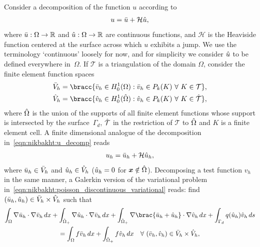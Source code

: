 Consider a decomposition of the function $u$ according to
%
\begin{equation}
  u = \Bar{u} + \mathcal{H} \Hat{u},
\label{eqn:nikbakht:u_decomp}
\end{equation}
%
where $\Bar{u}: \Omega \rightarrow \mathbb{R}$ and $\Hat{u}: \Omega
\rightarrow \mathbb{R}$ are continuous functions, and $\mathcal{H}$ is
the Heaviside function centered at the surface across which $u$ exhibits
a jump.  We use the terminology `continuous' loosely for now, and for
simplicity we consider $\Hat{u}$ to be defined everywhere in~$\Omega$.
If $\mathcal{T}$ is a triangulation of the domain $\Omega$, consider
the finite element function spaces
%
\begin{align}
  \Bar{V}_{h} &= \bracc{\Bar{v}_{h} \in H^{1}_{0}(\Omega)
                    : \Bar{v}_{h} \in P_{k}(K) \ \forall \ K \in \mathcal{T}},
\\
  \Hat{V}_{h} &= \bracc{\Hat{v}_{h} \in H^{1}_{0}(\Hat{\Omega})
                    : \Hat{v}_{h} \in P_{k}(K) \ \forall \ K \in \Hat{\mathcal{T}}},
\end{align}
%
where $\Hat{\Omega}$ is the union of the supports of all finite element
functions whose support is intersected by the surface~$\Gamma_{d}$,
$\Hat{\mathcal{T}}$ in the restriction of $\mathcal{T}$ to $\Hat{\Omega}$
and $K$ is a finite element cell.  A finite dimensional analogue of the
decomposition in~\eqref{eqn:nikbakht:u_decomp} reads
%
\begin{equation}
  u_{h} = \Bar{u}_{h} + \mathcal{H} \Hat{u}_{h},
  \label{eqn:nikbakht:u_h_decomp}
\end{equation}
%
where $\Bar{u}_{h} \in \Bar{V}_{h}$ and $\Hat{u}_{h}
\in \Hat{V}_{h}$ ($\Hat{u}_{h} = 0$ for $\boldsymbol{x} \notin
\Hat{\Omega}$).  Decomposing a test function $v_{h}$ in the
same manner, a Galerkin version of the variational problem
in~\eqref{eqn:nikbakht:poisson_discontinuous_variational} reads: find
$(\Bar{u}_{h}, \Hat{u}_{h}) \in \Bar{V}_{h} \times \Hat{V}_{h}$ such that
%
\begin{multline}
     \int_{\Omega} \nabla \Bar{u}_{h} \cdot \nabla \Bar{v}_{h} \dif x
     + \int_{\Hat{\Omega}_{+}} \nabla \Hat{u}_{h} \cdot  \nabla \Bar{v}_{h} \dif x
     + \int_{\Hat{\Omega}_{+}}  \nabla \brac{\Bar{u}_{h} + \Hat{u}_{h}} \cdot \nabla \Hat{v}_{h} \dif x
     + \int_{\Gamma_d} q(\Hat{u}_h)\Hat{v}_h \dif s
\\
  =
   \int_{\Omega} f \Bar{v}_{h} \dif x
 + \int_{\Hat{\Omega}_{+}}  f \Hat{v}_{h} \dif x
      \quad \forall \ (\Bar{v}_{h}, \Hat{v}_{h}) \in \Bar{V}_{h} \times \Hat{V}_{h},
\label{eqn:nikbakht:poisson_expanded_discontinuous_variational}
\end{multline}
